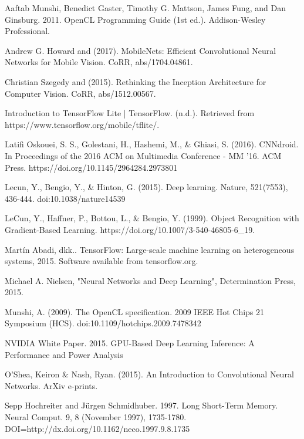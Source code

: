 %
% 

% 
% 
\begin{thebibliography}{4}
{Aaftab Munshi, Benedict Gaster, Timothy G. Mattson, James Fung, and Dan Ginsburg. 2011. OpenCL Programming Guide (1st ed.). Addison-Wesley Professional.}

{Andrew G. Howard and (2017). MobileNets: Efficient Convolutional Neural Networks for Mobile Vision. CoRR, abs/1704.04861.}

{Christian Szegedy and (2015). Rethinking the Inception Architecture for Computer Vision. CoRR, abs/1512.00567.}

{Introduction to TensorFlow Lite | TensorFlow. (n.d.). Retrieved from https://www.tensorflow.org/mobile/tflite/.}

{Latifi Oskouei, S. S., Golestani, H., Hashemi, M., \& Ghiasi, S. (2016). CNNdroid. In Proceedings of the 2016 ACM on Multimedia Conference - MM ’16. ACM Press. https://doi.org/10.1145/2964284.2973801}

{Lecun, Y., Bengio, Y., \& Hinton, G. (2015). Deep learning. Nature, 521(7553), 436-444. doi:10.1038/nature14539}

{LeCun, Y., Haffner, P., Bottou, L., \& Bengio, Y. (1999). Object Recognition with Gradient-Based Learning. https://doi.org/10.1007/3-540-46805-6\_19.}

{Martín Abadi, dkk.. TensorFlow: Large-scale machine learning on heterogeneous systems, 2015. Software available from tensorflow.org.}

{Michael A. Nielsen, "Neural Networks and Deep Learning", Determination Press, 2015.}

{Munshi, A. (2009). The OpenCL specification. 2009 IEEE Hot Chips 21 Symposium (HCS). doi:10.1109/hotchips.2009.7478342}

{NVIDIA White Paper. 2015. GPU-Based Deep Learning Inference: A Performance and Power Analysis}

{O'Shea, Keiron \& Nash, Ryan. (2015). An Introduction to Convolutional Neural Networks. ArXiv e-prints.}

{Sepp Hochreiter and Jürgen Schmidhuber. 1997. Long Short-Term Memory. Neural Comput. 9, 8 (November 1997), 1735-1780. DOI=http://dx.doi.org/10.1162/neco.1997.9.8.1735
}


\end{thebibliography}

